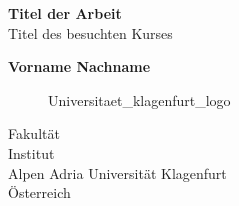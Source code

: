 \begin{titlepage}
    \begin{center}
        \vspace*{1cm}
        \Huge
        \textbf{Titel der Arbeit}\\
        \LARGE
        \vspace{0.5cm}
        Titel des besuchten Kurses

        \vspace{1.5cm}


        \textbf{Vorname Nachname \vspace{-1.1cm} \\ \hspace{5.5cm} \footnotesize \footnotemark}

        \Large

        \vspace{3cm}

        \begin{figure}[htp]
            \centering
            {Universitaet_klagenfurt_logo}
        \end{figure}
        Fakultät\\
        Institut\\
        Alpen Adria Universität Klagenfurt\\
        Österreich\\
        \datumVonHeute

    \end{center}
\end{titlepage}
